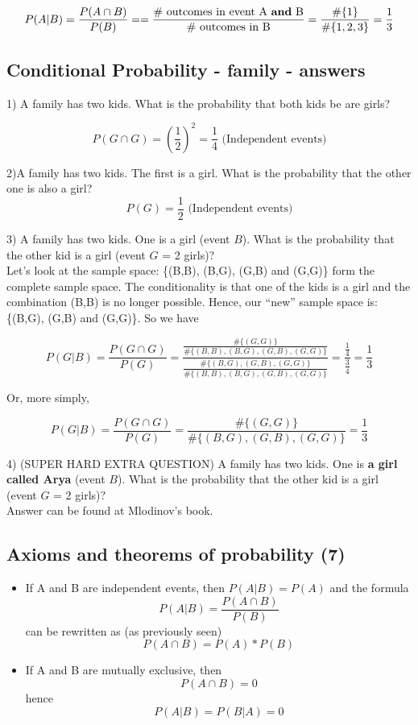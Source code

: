 \documentclass[11pt]{article}
\begin{document}
	
	\[P(A|B) = \frac{P(A\cap B)}{P(B)} = 		=\frac{\text{\# outcomes in event A \textbf{and} B}}
							{\text{\# outcomes in B}
							} = 
							\frac{\#\{1\}}{\#\{1,2,3\}}= 
							\frac{1}{3}\] 	 


	\subsection*{Conditional Probability - family - answers}
	1) A family has two kids. What is the probability that both kids be are girls?

	\[P(G \cap G) = \left(\frac{1}{2}\right)^2 = \frac{1}{4} \text{ (Independent events)}\]
	
	2)A family has two kids. The first is a girl. What is the probability that the other one is also a girl?\\

	\[P(G) = \frac{1}{2}\text{ (Independent events)}\]

	3) A family has two kids. One is a girl (event $B$). What is the probability that the other kid is a girl (event $G$ = 2 girls)?\\
	
	Let's look at the sample space: \{(B,B), (B,G), (G,B) and (G,G)\} form the complete sample space. The conditionality is that one of the kids is a girl and the combination (B,B) is no longer possible. Hence, our ``new'' sample space is: \{(B,G), (G,B) and (G,G)\}. So we have
	
	\[P(G|B) = \frac{P(G\cap G)}{P(G)} = \frac{\frac{\#\{(G,G)\}}{\#\{(B,B), (B,G), (G,B), (G,G)\}}}
							{\frac{\#\{(B,G), (G,B), (G,G)\}}{\#\{(B,B), (B,G), (G,B), (G,G)\}}} = 
							\frac{\frac{1}{4}}{\frac{3}{4}} = \frac{1}{3} \]

	Or, more simply, 
	
	\[P(G|B) = \frac{P(G\cap G)}{P(G)} = \frac{\#\{(G,G)\}}{\#\{(B,G), (G,B), (G,G)\}} = \frac{1}{3}\]

	4) (SUPER HARD EXTRA QUESTION) A family has two kids. One is \textbf{a girl called Arya} (event $B$). What is the probability that the other kid is a girl (event $G$ = 2 girls)?\\

	Answer can be found at Mlodinov's book.

	\subsection*{Axioms and theorems of probability (7)}
	\begin{itemize}
		\item If A and B are independent events, then $P(A|B) = P(A)$ and the formula
	\[P(A|B) = \frac{P(A\cap B)}{P(B)}\]
	can be rewritten as (as previously seen)
	\[P(A\cap B) = P(A)*P(B)\]
			\item If A and B are mutually exclusive, then
		\[P(A\cap B) = 0\]
			hence
		 \[P(A|B) = P(B|A) = 0\] 
	\end{itemize}
\end{document}
